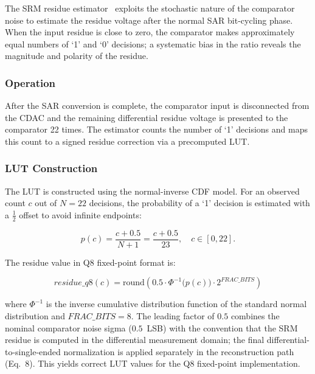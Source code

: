 \documentclass[journal]{IEEEtran}
\begin{document}
The SRM residue estimator~\cite{huang_jssc_2025,verbruggen_jssc_2015}
exploits the stochastic nature of the comparator noise to estimate the
residue voltage after the normal SAR bit-cycling phase. When the input
residue is close to zero, the comparator makes approximately equal numbers
of `1' and `0' decisions; a systematic bias in the ratio reveals the
magnitude and polarity of the residue.

\subsubsection{Operation}

After the SAR conversion is complete, the comparator input is disconnected
from the CDAC and the remaining differential residue voltage is presented
to the comparator 22 times. The estimator counts the number of `1' decisions
and maps this count to a signed residue correction via a precomputed LUT.

\subsubsection{LUT Construction}

The LUT is constructed using the normal-inverse CDF model. For an observed
count $c$ out of $N = 22$ decisions, the probability of a `1' decision is
estimated with a $\frac{1}{2}$ offset to avoid infinite endpoints:

\begin{equation}
p(c) = \frac{c + 0.5}{N + 1} = \frac{c + 0.5}{23}, \quad c \in [0, 22].
\label{eq:srm_prob}
\end{equation}

The residue value in Q8 fixed-point format is:

\begin{equation}
residue\_q8(c) = \mathrm{round}\left(0.5 \cdot
\Phi^{-1}\big(p(c)\big) \cdot 2^{FRAC\_BITS}\right)
\label{eq:srm_lut}
\end{equation}

where $\Phi^{-1}$ is the inverse cumulative distribution function of the
standard normal distribution and $FRAC\_BITS = 8$. The leading factor of $0.5$ combines the nominal comparator noise sigma
($0.5$~LSB) with the convention that the SRM residue is computed in the
differential measurement domain; the final differential-to-single-ended
normalization is applied separately in the reconstruction path (Eq.~8).
This yields correct LUT values for the Q8 fixed-point implementation.
\end{document}
